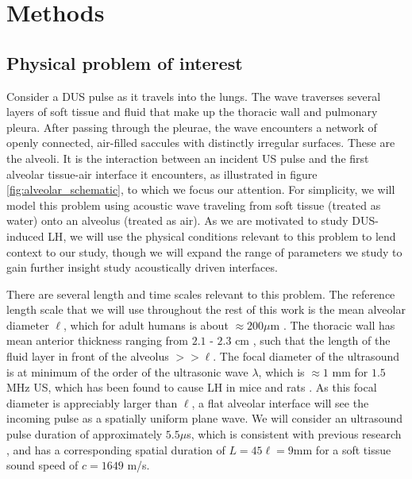 \section{Methods}%
\label{sec:methods}%
\subsection{Physical problem of interest}
\label{subsec:physical_problem}
Consider a \ac{DUS} pulse as it travels into the lungs. The wave
traverses several layers of soft tissue and fluid that make up the
thoracic wall and pulmonary pleura. After passing through the pleurae,
the wave encounters a network of openly connected, air-filled saccules
with distinctly irregular surfaces. These are the alveoli. It is the
interaction between an incident \ac{US} pulse and the first alveolar
tissue-air interface it encounters, as illustrated in figure
\ref{fig:alveolar_schematic}, to which we
focus our attention. For simplicity, we will model this problem using
acoustic wave traveling from soft tissue (treated as water) onto an
alveolus (treated as air). As we are motivated to study
\ac{DUS}-induced \ac{LH}, we will use the physical conditions relevant
to this problem to lend context to our study, though we will expand
the range of parameters we study to gain further insight study
acoustically driven interfaces.

There are several length and time scales relevant to this
problem. The reference length scale that we will use throughout the
rest of this work is the mean alveolar diameter $\ell$, which for
adult humans is about $\approx 200 \mu$m \citep{Ochs2004}. The
thoracic wall has mean anterior thickness ranging from $2.1$ - $2.3$
cm \cite{McLean2011}, such that the length of the fluid layer in front
of the alveolus $>>\ell$. The focal diameter of the ultrasound is at
minimum of the order of the ultrasonic wave $\lambda$, which is
$\approx 1$ mm for $1.5$ MHz \ac{US}, which has been found to cause
\ac{LH} in mice and rats \cite{Child1990,Miller2015a}. As this focal diameter is
appreciably larger than $\ell$, a flat alveolar interface will see the
incoming pulse as a spatially uniform plane wave. We will consider an
ultrasound pulse duration of approximately $5.5 \mu$s, which is
consistent with previous research \citep{Child1990}, and has a
corresponding spatial duration of $L=45\ell = 9$mm for a soft tissue sound
speed of $c=1649$ m/s. 

